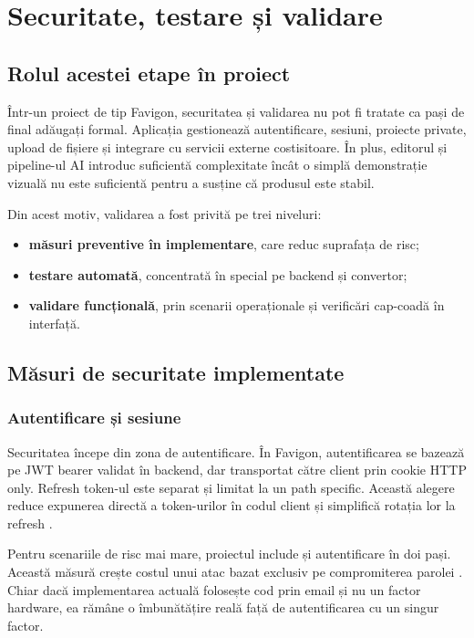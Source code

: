 \chapter{Securitate, testare și validare}

\section{Rolul acestei etape în proiect}

Într-un proiect de tip Favigon, securitatea și validarea nu pot fi tratate ca pași de final adăugați formal. Aplicația gestionează autentificare, sesiuni, proiecte private, upload de fișiere și integrare cu servicii externe costisitoare. În plus, editorul și pipeline-ul AI introduc suficientă complexitate încât o simplă demonstrație vizuală nu este suficientă pentru a susține că produsul este stabil.

Din acest motiv, validarea a fost privită pe trei niveluri:

\begin{itemize}[leftmargin=1.5cm]
  \item \textbf{măsuri preventive în implementare}, care reduc suprafața de risc;
  \item \textbf{testare automată}, concentrată în special pe backend și convertor;
  \item \textbf{validare funcțională}, prin scenarii operaționale și verificări cap-coadă în interfață.
\end{itemize}

\section{Măsuri de securitate implementate}

\subsection{Autentificare și sesiune}

Securitatea începe din zona de autentificare. În Favigon, autentificarea se bazează pe JWT bearer validat în backend, dar transportat către client prin cookie HTTP only. Refresh token-ul este separat și limitat la un path specific. Această alegere reduce expunerea directă a token-urilor în codul client și simplifică rotația lor la refresh \cite{aspnetJwt2025,owaspAuth2026}.

Pentru scenariile de risc mai mare, proiectul include și autentificare în doi pași. Această măsură crește costul unui atac bazat exclusiv pe compromiterea parolei \cite{owaspMfa2026}. Chiar dacă implementarea actuală folosește cod prin email și nu un factor hardware, ea rămâne o îmbunătățire reală față de autentificarea cu un singur factor.


